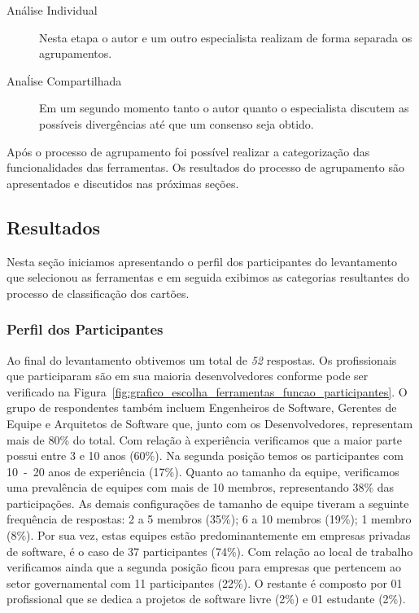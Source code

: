 \begin{description}
	\item[Análise Individual] Nesta etapa o autor e um outro especialista
		realizam de forma separada os agrupamentos.
	\item[Anaĺise Compartilhada] Em um segundo momento tanto o autor quanto o
		es\-pe\-ci\-a\-lis\-ta discutem as possíveis divergências até que um
		consenso seja obtido.
\end{description}

Após o processo de agrupamento foi possível realizar a categorização das
funcionalidades das ferramentas. Os resultados do processo de agrupamento são
apresentados e discutidos nas próximas seções.

\subsection{Resultados}\label{sec:resultados}

Nesta seção iniciamos apresentando o perfil dos participantes do levantamento
que selecionou as ferramentas e em seguida exibimos as categorias resultantes do
processo de classificação dos cartões.

\subsubsection{Perfil dos Participantes}\label{ssub:perfil_participantes}

Ao final do levantamento obtivemos um total de \textit{52} respostas. Os
profissionais que participaram são em sua maioria desenvolvedores conforme pode
ser verificado na
Figura~\ref{fig:grafico_escolha_ferramentas_funcao_participantes}. O grupo de
respondentes também incluem Engenheiros de Software, Gerentes de Equipe e
Arquitetos de Software que, junto com os Desenvolvedores, representam mais de
80\% do total. Com relação à experiência verificamos que a maior parte possui
entre 3 e 10 anos (60\%). Na segunda posição temos os participantes com 10~-~20
anos de experiência (17\%). Quanto ao tamanho da equipe, verificamos uma
prevalência de equipes com mais de 10 membros, representando 38\% das
participações. As demais configurações de tamanho de equipe tiveram a seguinte
frequência de respostas: 2 a 5 membros (35\%); 6 a 10 membros (19\%); 1 membro
(8\%). Por sua vez, estas equipes estão predominantemente em empresas privadas
de software, é o caso de 37 participantes (74\%). Com relação ao local de
trabalho verificamos ainda que a segunda posição ficou para empresas que
pertencem ao setor governamental com 11 participantes (22\%). O restante é
composto por 01 profissional que se dedica a projetos de software livre (2\%) e
01 estudante (2\%).

